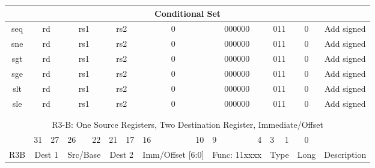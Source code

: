 \documentclass{article}
\begin{document}
\begin{center}
\begin{longtable}{|c|l|r|l|r|l|r|l|r|l|r|l|r|c|c|}
                    \multicolumn{15}{|c|}{Conditional Set} \\   
    \hline seq  &   \multicolumn{2}{|c|}{rd}            &   \multicolumn{2}{|c|}{rs1}       &   \multicolumn{2}{|c|}{rs2}           &   \multicolumn{2}{|c|}{0}             &   \multicolumn{2}{|c|}{000000}    &   \multicolumn{2}{|c|}{011}       &   0       &   Add signed \\
    \hline sne  &   \multicolumn{2}{|c|}{rd}            &   \multicolumn{2}{|c|}{rs1}       &   \multicolumn{2}{|c|}{rs2}           &   \multicolumn{2}{|c|}{0}             &   \multicolumn{2}{|c|}{000000}    &   \multicolumn{2}{|c|}{011}       &   0       &   Add signed \\
    \hline sgt  &   \multicolumn{2}{|c|}{rd}            &   \multicolumn{2}{|c|}{rs1}       &   \multicolumn{2}{|c|}{rs2}           &   \multicolumn{2}{|c|}{0}             &   \multicolumn{2}{|c|}{000000}    &   \multicolumn{2}{|c|}{011}       &   0       &   Add signed \\
    \hline sge  &   \multicolumn{2}{|c|}{rd}            &   \multicolumn{2}{|c|}{rs1}       &   \multicolumn{2}{|c|}{rs2}           &   \multicolumn{2}{|c|}{0}             &   \multicolumn{2}{|c|}{000000}    &   \multicolumn{2}{|c|}{011}       &   0       &   Add signed \\
    \hline slt  &   \multicolumn{2}{|c|}{rd}            &   \multicolumn{2}{|c|}{rs1}       &   \multicolumn{2}{|c|}{rs2}           &   \multicolumn{2}{|c|}{0}             &   \multicolumn{2}{|c|}{000000}    &   \multicolumn{2}{|c|}{011}       &   0       &   Add signed \\
    \hline sle  &   \multicolumn{2}{|c|}{rd}            &   \multicolumn{2}{|c|}{rs1}       &   \multicolumn{2}{|c|}{rs2}           &   \multicolumn{2}{|c|}{0}             &   \multicolumn{2}{|c|}{000000}    &   \multicolumn{2}{|c|}{011}       &   0       &   Add signed \\

    \hline          \multicolumn{15}{c}{} \\

    
                    \multicolumn{15}{c}{} \\
    
                    \multicolumn{15}{c}{R3-B: One Source Registers, Two Destination Register, Immediate/Offset} \\  
    \hline      &   \multicolumn{1}{l}{31}  &   27      &   \multicolumn{1}{l}{26}  &   22  &   \multicolumn{1}{l}{21}  &   17      &   \multicolumn{1}{l}{16}  &   10          &   \multicolumn{1}{l}{9}   &   4       &   \multicolumn{1}{l}{3}   &   1   &   0       & \\
    \hline R3B  &   \multicolumn{2}{|c|}{Dest 1}    &   \multicolumn{2}{|c|}{Src/Base}  &   \multicolumn{2}{|c|}{Dest 2}    &   \multicolumn{2}{|c|}{Imm/Offset [6:0]}  &   \multicolumn{2}{|c|}{Func: 11xxxx}  &   \multicolumn{2}{|c|}{Type}      &   Long    &   Description \\
    

\end{longtable}
\end{center}
\end{document}
